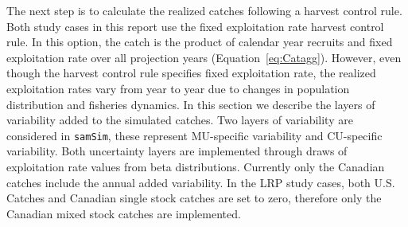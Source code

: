 \documentclass[11pt]{book}
\begin{document}
The next step is to calculate the realized catches following a harvest control rule. Both study cases in this report use the fixed exploitation rate harvest control rule. In this option, the catch is the product of calendar year recruits and fixed exploitation rate over all projection years (Equation~\ref{eq:Catagg}). However, even though the harvest control rule specifies fixed exploitation rate, the realized exploitation rates vary from year to year due to changes in population distribution and fisheries dynamics. In this section we describe the layers of variability added to the simulated catches. Two layers of variability are considered in \texttt{samSim}, these represent MU-specific variability and CU-specific variability. Both uncertainty layers are implemented through draws of exploitation rate values from beta distributions. Currently only the Canadian catches include the annual added variability. In the LRP study cases, both U.S. Catches and Canadian single stock catches are set to zero, therefore only the Canadian mixed stock catches are implemented.
\end{document}
